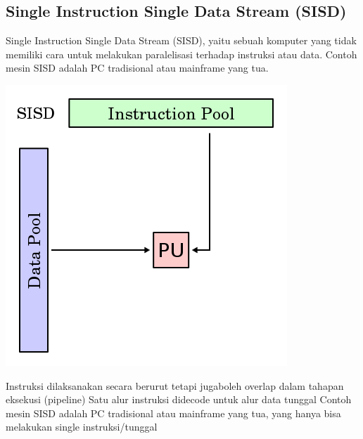 \documentclass[a4paper,12pt]{article}
\begin{document}
\subsection{Single Instruction Single Data Stream (SISD)}

Single Instruction Single Data Stream (SISD), yaitu sebuah komputer yang tidak memiliki cara untuk melakukan paralelisasi terhadap instruksi atau data. Contoh mesin SISD adalah PC tradisional atau mainframe yang tua.
\begin{center}
    \includegraphics[width=0.8\linewidth]{sisd.png}
\end{center}
Instruksi dilaksanakan secara berurut tetapi jugaboleh overlap dalam tahapan eksekusi (pipeline)
Satu alur instruksi didecode untuk alur data tunggal
Contoh mesin SISD adalah PC tradisional atau mainframe yang tua, yang hanya bisa melakukan single instruksi/tunggal
\end{document}
